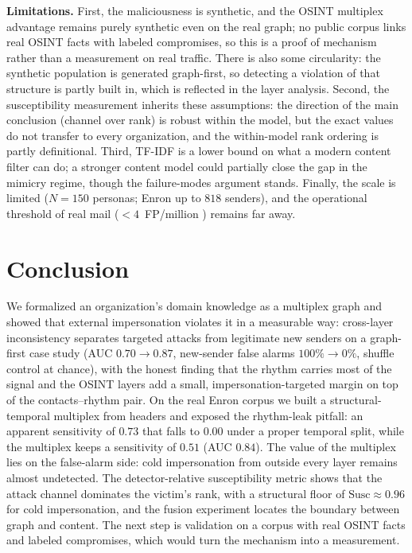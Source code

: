 \documentclass[conference]{IEEEtran}
\begin{document}
\textbf{Limitations.} First, the maliciousness is synthetic, and the OSINT multiplex advantage remains purely
synthetic even on the real graph; no public corpus links real OSINT facts with labeled compromises, so this is
a proof of mechanism rather than a measurement on real traffic. There is also some circularity: the synthetic
population is generated graph-first, so detecting a violation of that structure is partly built in, which is
reflected in the layer analysis. Second, the susceptibility measurement inherits these assumptions: the
direction of the main conclusion (channel over rank) is robust within the model, but the exact values do not transfer to every organization, and the within-model rank ordering is
partly definitional. Third, TF-IDF is a lower bound on what a modern content filter can do; a stronger content
model could partially close the gap in the mimicry regime, though the failure-modes argument stands. Finally,
the scale is limited ($N{=}150$ personas; Enron up to $818$ senders), and the operational threshold of real
mail ($<\!4$~FP/million \cite{ho2019detecting}) remains far away.

\section{Conclusion}
\label{sec:conclusion}
We formalized an organization's domain knowledge as a multiplex graph and showed that external impersonation
violates it in a measurable way: cross-layer inconsistency separates targeted attacks from legitimate new
senders on a graph-first case study (AUC $0.70\!\to\!0.87$, new-sender false alarms $100\%\!\to\!0\%$, shuffle
control at chance), with the honest finding that the rhythm carries most of the signal and the OSINT layers
add a small, impersonation-targeted margin on top of the contacts--rhythm pair. On the real Enron
corpus we built a structural-temporal multiplex from headers and exposed the rhythm-leak pitfall: an apparent
sensitivity of $0.73$ that falls to $0.00$ under a proper temporal split, while the multiplex keeps a sensitivity of $0.51$ (AUC $0.84$).
The value of the multiplex lies on the false-alarm side: cold impersonation from outside every layer remains
almost undetected. The detector-relative susceptibility metric shows that the attack channel dominates the
victim's rank, with a structural floor of $\mathrm{Susc}\approx0.96$ for cold impersonation, and the fusion
experiment locates the boundary between graph and content. The next step is validation on a corpus with real OSINT facts and labeled compromises,
which would turn the mechanism into a measurement.
\end{document}
